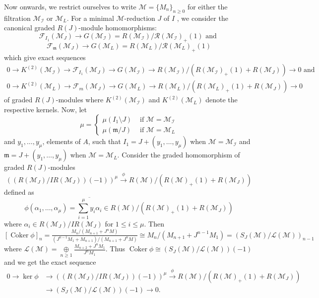 \documentclass[11pt,reqno]{amsart}
\theoremstyle{definition}
\newcommand{\m}{\mathfrak m}
\def\R{{\mathcal R}}
\def\F{{\mathcal F}}
\def\M{{\mathcal M}}
\def\I{{\mathcal I}}
\def\L{{\mathcal L}}
\DeclareMathOperator{\coker}{Coker}
\numberwithin{equation}{section}
\begin{document}
Now onwards, we restrict ourselves to write $\M=\{M_n\}_{n\geq 0}$ for either the filtration $\M_\I$ or $\M_L$. 
For a minimal $\M$-reduction $J$ of $I$ , we consider the canonical graded $R(J)$-module homomorphisms: $$\F_{I_1}(\M_J)\to G(\M_\I)=R(\M_\I)/\R(\M_\I)_{+}(1) \text{ and }$$  $$\F_{\m}(\M_J)\to G(\M_L)=R(\M_L)/\R(\M_L)_{+}(1)$$ which give  exact sequences 
	\begin{eqnarray} \label{equation:step1}
		0\to K^{(2)}(\M_\I)\to \F_{I_1}(\M_J)\to G(\M_\I)\to R(\M_\I)/(R(\M_\I)_{+}(1)+R(\M_J))\to 0 \text { and }\\
       \label{equation:step1(a)} 0\to K^{(2)}(\M_L)\to \F_{m}(\M_J)\to G(\M_L)\to R(\M_L)/(R(\M_L)_{+}(1)+R(\M_J))\to 0
	\end{eqnarray}    
	of graded $R(J)$-modules where $K^{(2)}(\M_\I)$ and $K^{(2)}(\M_L)$ denote the respective kernels.  Now, let \begin{equation}
    \mu= \begin{cases}
\mu(I_1\setminus J) & \mbox{ if } \M=\M_\I \\  
\mu(\m/J) & \mbox{ if } \M=\M_L 
    \end{cases}
    \end{equation}
and $y_1,\ldots,y_{\mu}$, elements of $A$, such that $I_1=J+(y_1,\ldots,y_\mu)$ when $\M=\M_\I$ and $\m=J+(y_1,\ldots,y_\mu)$ when $\M=\M_L$.  Consider the graded homomorphism of graded $R(J)$-modules $$((R(\M_J)/IR(\M_J))(-1))^\mu\xrightarrow{\phi} R(\M)/(R(\M)_{+}(1)+R(\M_J))$$ defined as
	$$\phi(\alpha_1,\ldots,\alpha_\mu )=\overline{\mathop\sum_{i=1}^\mu y_i\alpha_i  }\in R(\M)/(R(\M)_{+}(1)+R(\M_J))$$
    where $\alpha_i\in R(\M_J)/I R(\M_J)$ for $1\leq i\leq \mu.$ Then 
$[\coker \phi]_n=\frac{M_n/(M_{n+1}+J^nM)}{( J^{n-1}M_1+M_{n+1})/(M_{n+1}+J^nM)}\cong M_n/(M_{n+1}+ J^{n-1}M_1)=(S_J(\M)/\L(\M))_{n-1}$ where $\L(\M)=\mathop\oplus\limits_{n\geq 1}\frac{M_{n+2}+J^{n}M_1}{ J^{n}M_1}$.  Thus 
	$\coker\phi\cong (S_J(\M)/\L(\M))(-1)$ and we get the exact sequence
	\begin{equation}\label{equation:step2}
    \begin{aligned}
        0\to \ker\phi&\to ((R(\M_J)/IR(\M_J)) (-1))^\mu\xrightarrow{\phi} R(\M)/(R(\M)_+(1)+R(\M_J))\\
        &\to (S_J(\M)/\L(\M))(-1)\to 0.
    \end{aligned}
	\end{equation}
\end{document}
